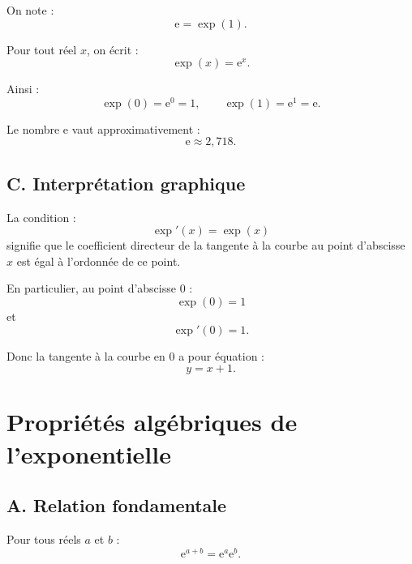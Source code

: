 \documentclass[11pt,a4paper]{article}
\newcommand{\e}{\mathrm{e}}
\begin{document}
\begin{definitionbox}
On note :
\[
\e=\exp(1).
\]

Pour tout réel $x$, on écrit :
\[
\exp(x)=\e^x.
\]
\end{definitionbox}

Ainsi :
\[
\exp(0)=\e^0=1,
\qquad
\exp(1)=\e^1=\e.
\]

Le nombre $\e$ vaut approximativement :
\[
\e \approx 2,718.
\]

\subsection*{C. Interprétation graphique}

La condition :
\[
\exp'(x)=\exp(x)
\]
signifie que le coefficient directeur de la tangente à la courbe au point d'abscisse $x$ est égal à l'ordonnée de ce point.

En particulier, au point d'abscisse $0$ :
\[
\exp(0)=1
\]
et
\[
\exp'(0)=1.
\]

Donc la tangente à la courbe en $0$ a pour équation :
\[
y=x+1.
\]

\begin{center}
\end{center}

\section{Propriétés algébriques de l'exponentielle}

\subsection*{A. Relation fondamentale}

\begin{theoremebox}
Pour tous réels $a$ et $b$ :
\[
\e^{a+b}=\e^a\e^b.
\]
\end{theoremebox}
\end{document}
